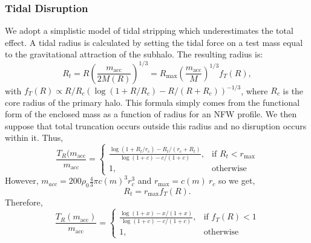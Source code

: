 \documentclass[usenatbib]{mnras}
\begin{document}
\subsubsection{Tidal Disruption} 

We adopt a simplistic model of tidal stripping which underestimates the total effect. A tidal radius is calculated by setting the tidal force on a test mass equal to the gravitational attraction of the subhalo. The resulting radius is:
\begin{equation}
R_t = R \left(\frac{m_{\text{acc}}}{2 M(R)}\right)^{1/3} =  R_{\text{max}} \left(\frac{m_{\text{acc}}}{M}\right)^{1/3} f_T(R), 
\end{equation} 
with $f_T(R) \propto R/R_c(\log(1+R/R_c) - R/(R+R_c))^{-1/3}$, where $R_c$ is the core radius of the primary halo. This formula simply comes from the functional form of the enclosed mass as a function of radius for an NFW profile. We then suppose that total truncation occurs outside this radius and no disruption occurs within it. Thus,
\begin{equation}
\frac{T_R(m_{\text{acc}}}{m_{\text{acc}}} = 
\begin{cases}
\frac{\log{(1+R_t/r_c)} - R_t/(r_c+R_t)}{\log{(1+c)} - c/(1+c)},
& \text{if } R_t < r_{\text{max}}
\\
    1,              & \text{otherwise}
\end{cases}
\end{equation} 
However, $m_{acc} = 200 \rho_0 \frac{4}{3} \pi c(m)^3 r_c^3$ and $r_{\text{max}} = c(m) \: r_{c}$ so we get,
\begin{equation}
R_t = r_{\text{max}} f_T(R).
\end{equation}
Therefore,
\begin{equation} \label{trunc}
\frac{T_R(m_{\text{acc}})}{m_{\text{acc}}} =
\begin{cases}
\frac{\log{(1 + x)} - x/(1 + x)}{\log{(1+c)} - c/(1+c)},& \text{if } f_T(R) < 1
\\
1, & \text{otherwise}
\end{cases}
\end{equation} 
\end{document}
